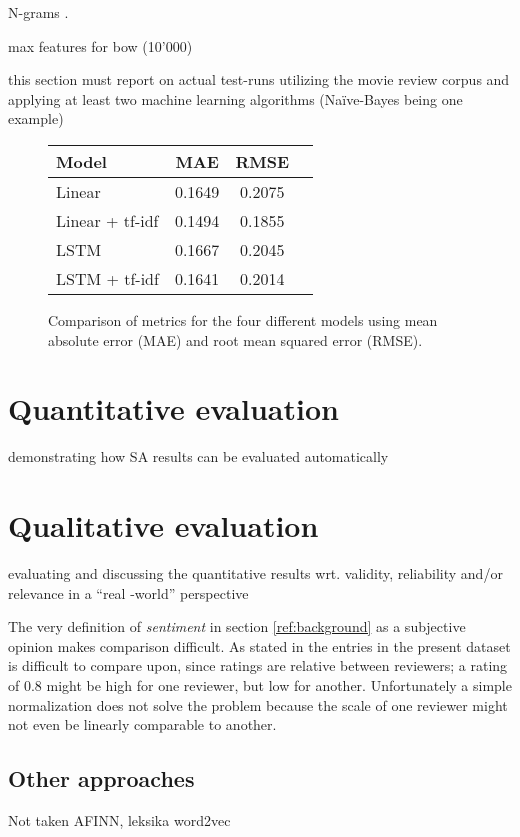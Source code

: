 \documentclass[a4paper]{article}
\begin{document}
N-grams \cite{Jurafsky2000}.

max features for bow (10'000)

this section must
report on actual test-runs utilizing the movie review corpus and applying at least two
machine learning algorithms (Naïve-Bayes being one example)

\begin{figure}
  \begin{centering}
    \begin{tabular}{ l c c c }
      \textbf{Model} & \textbf{MAE} & \textbf{RMSE} \\ \hline
      Linear & 0.1649 & 0.2075 \\
      Linear + tf-idf & 0.1494 & 0.1855 \\
      LSTM & 0.1667 & 0.2045 \\
      LSTM + tf-idf & 0.1641 & 0.2014
    \end{tabular}
    \caption{Comparison of metrics for the four different models using mean absolute error (MAE) and root mean squared error (RMSE).}
  \end{centering}
\end{figure}

\section{Quantitative evaluation}
demonstrating how SA results can be evaluated
automatically

\section{Qualitative evaluation}
evaluating and discussing the quantitative results wrt.
validity, reliability and/or relevance in a “real
-world” perspective

The very definition of \textit{sentiment} in section \ref{ref:background} as
a subjective opinion makes comparison difficult. As stated in \citep{PangLee2005}
the entries in the present dataset is difficult to compare upon, since ratings
are relative between reviewers; a rating of 0.8 might be high for one reviewer,
but low for another. Unfortunately a simple normalization does not solve the
problem because the scale of one reviewer might not even be linearly
comparable to another.

\subsection{Other approaches}
Not taken
AFINN, leksika
word2vec
\cite{IMM2011-06010}
\end{document}
